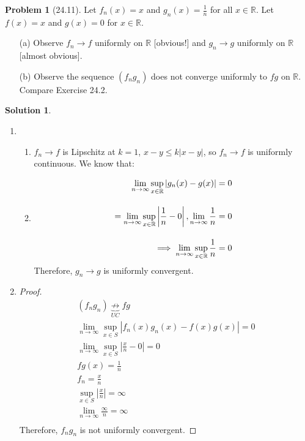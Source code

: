 \documentclass[12pt]{article}
\theoremstyle{definition} %
\newtheorem{solution}{Solution}
\newtheorem{problem}{Problem}
\theoremstyle{plain} %
\begin{document}
\begin{problem}[24.11]
    Let \( f_n(x) = x \) and \( g_n(x) = \frac{1}{n} \) for all \( x \in \mathbb{R} \). Let \( f(x) = x \) and \( g(x) = 0 \) for \( x \in \mathbb{R} \).

\begin{enumerate}
    \item[(a)] Observe \( f_n \to f \) uniformly on \( \mathbb{R} \) [obvious!] and \( g_n \to g \) uniformly on \( \mathbb{R} \) [almost obvious].
    \item[(b)] Observe the sequence \( (f_n g_n) \) does not converge uniformly to \( fg \) on \( \mathbb{R} \). Compare Exercise 24.2.
\end{enumerate}
\end{problem}
\begin{solution}
     \begin{enumerate}
    \item \begin{enumerate}
        \item \(f_{n}\to f\) is Lipschitz at \(k=1\), \(x-y\leq k\left\vert x-y \right\vert \), so \(f_{n}\to f\) is uniformly continuous. We know that:
        \item \begin{align}
            \lim_{n \to \infty}\sup_{x\in \mathbb{\MakeUppercase{r}}}\left\vert g_{n}(x)-g(x) \right\vert= 0\\[10pt] 
            = \lim_{n \to \infty}\sup_{x\in \mathbb{\MakeUppercase{r}}} \left\vert \frac{1}{n}-0 \right\vert, \lim_{n \to \infty} \frac{1}{n}=0 \\[10pt] 
            \implies \lim_{n \to \infty} \sup_{x\in \mathbb{\MakeUppercase{r}} } \frac{1}{n}=0
        \end{align}
        Therefore, \(g_{n}\to g\) is uniformly convergent. 
        \end{enumerate}
    \item \begin{proof}
        \begin{align}
            (f_{n}g_{n}) \underbrace{\not\to}_{UC} fg \\[10pt] 
            \lim_{n \to \infty} \sup_{x\in S} \left\vert f_{n}(x)g_{n}(x)-f(x)g(x) \right\vert = 0\\[10pt] 
            \lim_{n \to \infty} \sup_{x\in S} \left\vert \frac{x}{n}-0 \right\vert =0 \\[10pt] 
            fg(x) = \frac{1}{n} \\[10pt] 
            f_{n}=\frac{x}{n} \\[10pt] 
            \sup_{x\in S}\left\vert \frac{x}{n} \right\vert = \infty \\[10pt] 
            \lim_{n \to \infty} \frac{\infty}{n} = \infty \\[10pt] 
        \end{align}
        Therefore, \(f_{n}g_{n}\) is not uniformly convergent. 
    \end{proof}
     \end{enumerate}
    \end{solution}
\end{document}
